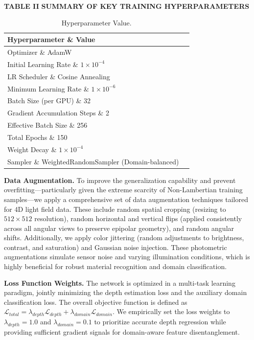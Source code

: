 \textbf{TABLE II}
\textbf{SUMMARY OF KEY TRAINING HYPERPARAMETERS}

\begin{table}[!t]
\caption{Hyperparameter Value.}
\label{tab:table2}
\centering
\begin{tabular}{ll}
\toprule
Hyperparameter \& Value \\
\midrule
Optimizer \& AdamW \\
Initial Learning Rate \& $1 \times 10^{-4}$ \\
LR Scheduler \& Cosine Annealing \\
Minimum Learning Rate \& $1 \times 10^{-6}$ \\
Batch Size (per GPU) \& 32 \\
Gradient Accumulation Steps \& 2 \\
Effective Batch Size \& 256 \\
Total Epochs \& 150 \\
Weight Decay \& $1 \times 10^{-4}$ \\
Sampler \& WeightedRandomSampler (Domain-balanced) \\
\bottomrule
\end{tabular}
\end{table}
\textbf{Data Augmentation.} 
To improve the generalization capability and prevent overfitting—particularly given the extreme scarcity of Non-Lambertian training samples—we apply a comprehensive set of data augmentation techniques tailored for 4D light field data. These include random spatial cropping (resizing to $512 \times 512$ resolution), random horizontal and vertical flips (applied consistently across all angular views to preserve epipolar geometry), and random angular shifts. Additionally, we apply color jittering (random adjustments to brightness, contrast, and saturation) and Gaussian noise injection. These photometric augmentations simulate sensor noise and varying illumination conditions, which is highly beneficial for robust material recognition and domain classification.

\textbf{Loss Function Weights.} 
The network is optimized in a multi-task learning paradigm, jointly minimizing the depth estimation loss and the auxiliary domain classification loss. The overall objective function is defined as $\mathcal{L}_{total} = \lambda_{depth} \mathcal{L}_{depth} + \lambda_{domain} \mathcal{L}_{domain}$. We empirically set the loss weights to $\lambda_{depth} = 1.0$ and $\lambda_{domain} = 0.1$ to prioritize accurate depth regression while providing sufficient gradient signals for domain-aware feature disentanglement.

